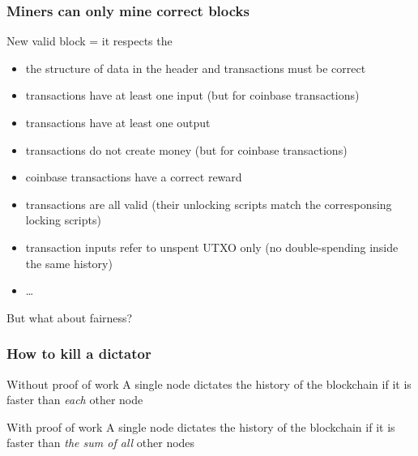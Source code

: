 \documentclass[11pt]{beamer}  %
\begin{document}
\begin{frame}\frametitle{Miners can only mine correct blocks}

  \begin{greenbox}{New valid block = it respects the {\color{pink}{consensus rules}}}
    \begin{itemize}
    \item the structure of data in the header and transactions must be correct
    \item transactions have at least one input (but for coinbase transactions)
    \item transactions have at least one output
    \item transactions do not create money (but for coinbase transactions)
    \item coinbase transactions have a correct reward
    \item transactions are all valid (their unlocking scripts match the corresponsing locking scripts)
    \item transaction inputs refer to unspent UTXO only
      (\alert{no double-spending inside the same history})
    \item \ldots
    \end{itemize}
  \end{greenbox}

  \medskip

  \begin{redbox}{}
    \begin{center}
      But what about fairness?
    \end{center}
  \end{redbox}

\end{frame}

\begin{frame}\frametitle{How to kill a dictator}

  \begin{greenbox}{Without proof of work}
    A single node dictates the history of the blockchain
    if it is faster than \emph{each} other node
  \end{greenbox}

  \pause
  \bigskip
  \bigskip

  \begin{greenbox}{With proof of work}
    A single node dictates the history of the blockchain
    if it is faster than \emph{the sum of all} other nodes
  \end{greenbox}

\end{frame}
\end{document}
